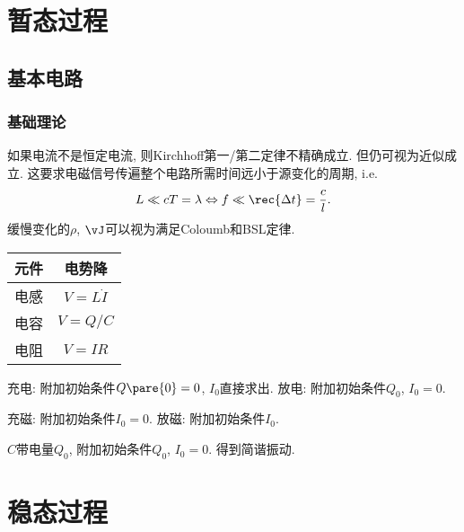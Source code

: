 \documentclass[hidelinks]{ctexart}
\begin{document}

\section{暂态过程} %
\label{sec:暂态过程}

\subsection{基本电路} %
\label{sub:基本电路}

\subsubsection{基础理论} %
\label{ssub:基础理论}

如果电流不是恒定电流, 则Kirchhoff第一/第二定律不精确成立. 但仍可视为近似成立. 这要求电磁信号传遍整个电路所需时间远小于源变化的周期, i.e.
\[ L \ll cT = \lambda \Leftrightarrow f\ll\rec{\Delta t} = \frac{c}{l}. \]
缓慢变化的$\rho$, $\vJ$可以视为满足Coloumb和BSL定律.
\par
\begin{table}
    \begin{tabular}{|c|c|}
    \hline
    元件 & 电势降\\
    \hline
    电感 & $V = L\dot{I}$\\
    \hline
    电容 & $V = Q/C$\\
    \hline
    电阻 & $V = IR$\\
    \hline
    \end{tabular}
\end{table}
\begin{ex}[RC电路]
    充电: 附加初始条件$Q\pare{0}=0$, $I_0$直接求出.
    放电: 附加初始条件$Q_0$, $I_0 = 0$.
\end{ex}
\begin{ex}[RL电路]
    充磁: 附加初始条件$I_0=0$.
    放磁: 附加初始条件$I_0$.
\end{ex}
\begin{ex}[LC电路]
    $C$带电量$Q_0$, 附加初始条件$Q_0$, $I_0=0$. 得到简谐振动.
\end{ex}



    
\section{稳态过程} %
\label{sec:稳态过程}
\end{document}
